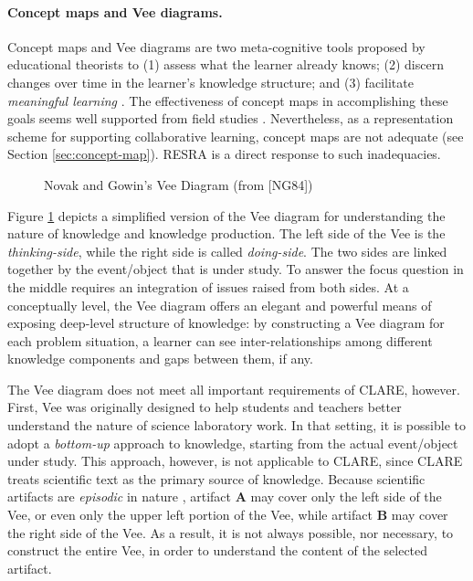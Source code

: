 \paragraph{Concept maps and Vee diagrams.}

Concept maps and Vee diagrams are two meta-cognitive tools proposed by
educational theorists to (1) assess what the learner already knows; (2)
discern changes over time in the learner's knowledge structure; and (3)
facilitate {\it meaningful learning\/} \cite{Novak84}. The effectiveness of
concept maps in accomplishing these goals seems well supported from field
studies \cite{Cliburn90,Novak90,Roth92,Arnaudin84}.  Nevertheless, as a
representation scheme for supporting collaborative learning, concept maps
are not adequate (see Section \ref{sec:concept-map}).  RESRA is a direct
response to such inadequacies.

\begin{figure}[htbp]
 \caption{Novak and Gowin's Vee Diagram (from [NG84])}
  \label{fig:vee}
\end{figure}

Figure \ref{fig:vee} depicts a simplified version of the Vee diagram for
understanding the nature of knowledge and knowledge production. The left
side of the Vee is the {\it thinking-side\/}, while the right side is
called {\it doing-side\/}. The two sides are linked together by the
event/object that is under study. To answer the focus question in the
middle requires an integration of issues raised from both sides. At a
conceptually level, the Vee diagram offers an elegant and powerful means of
exposing deep-level structure of knowledge: by constructing a Vee diagram
for each problem situation, a learner can see inter-relationships among
different knowledge components and gaps between them, if any.

The Vee diagram does not meet all important requirements of CLARE, however.
First, Vee was originally designed to help students and teachers better
understand the nature of science laboratory work. In that setting, it is
possible to adopt a {\it bottom-up\/} approach to knowledge, starting from
the actual event/object under study. This approach, however, is not
applicable to CLARE, since CLARE treats scientific text as the primary
source of knowledge.  Because scientific artifacts are {\it episodic\/} in
nature \cite{Swaminathan90}, artifact {\bf A} may cover only the left side
of the Vee, or even only the upper left portion of the Vee, while artifact
{\bf B} may cover the right side of the Vee. As a result, it is not always
possible, nor necessary, to construct the entire Vee, in order to
understand the content of the selected artifact.

